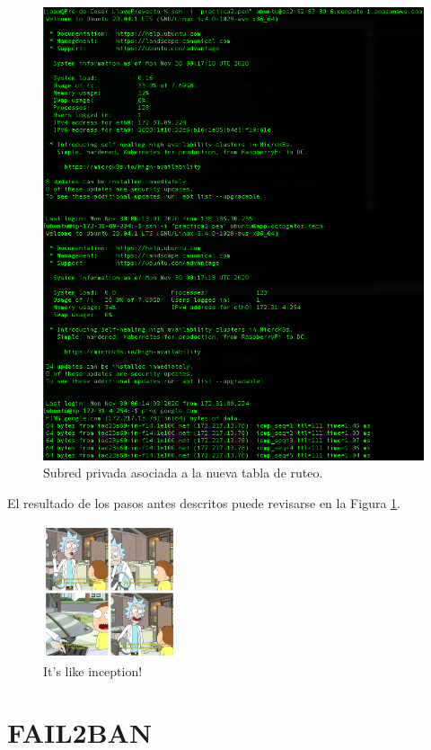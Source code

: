 \documentclass{article}
\begin{document}
\begin{figure}[H]
  \centering
  \includegraphics[width=\textwidth]{NAT/result}
  \caption{Subred privada asociada a la nueva tabla
  de ruteo.}
  \label{fig:NAT-result}
\end{figure}

El resultado de los pasos antes descritos puede
revisarse en la Figura \ref{fig:NAT-result}.
\begin{figure}[H]
  \centering
  \includegraphics[width=0.35\textwidth]{NAT/inception}
  \caption{It's like inception!}
\end{figure}

\section{FAIL2BAN}
\end{document}
